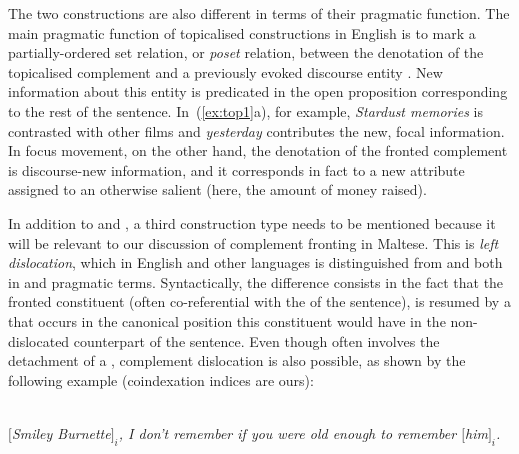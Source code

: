 \documentclass[output=paper]{LSP/langsci}
\begin{document}
\begin{exe}
  \ex{}
  \begin{xlist}
  \end{xlist}
  \label{ex:top1}
\end{exe}

The two constructions are also different in terms of their pragmatic
function. The main pragmatic function of topicalised constructions in
English is to mark a partially-ordered set relation, or {\em poset}
relation, between the denotation of the topicalised complement and a
previously evoked discourse entity \citep{Prince1981a}. New information
about this entity is predicated in the open proposition corresponding
to the rest of the sentence. In~(\ref{ex:top1}a), for example, {\em
  Stardust memories} is contrasted with other films and {\em
  yesterday} contributes the new, focal information. In focus
movement, on the other hand, the denotation of the fronted complement
is discourse-new information, and it corresponds in fact to a new
attribute assigned to an otherwise salient  (here, the
amount of money raised).

In addition to  and , a third construction
type needs to be mentioned because it will be relevant to our
discussion of complement fronting in Maltese. This is {\em left
  dislocation}, which in English and other languages is distinguished
from  and  both in  and pragmatic
terms. Syntactically, the difference consists in the fact that the
fronted constituent (often co-referential with the  of the
sentence), is resumed by a  that occurs in the canonical
position this constituent would have in the non-dislocated counterpart
of the sentence. Even though  often involves the
detachment of a , complement dislocation is also possible, as
shown by the following example (coindexation indices are ours):

\begin{exe}  
  \ex{}
  {\citealt[27]{GregoryMichaelis2001}}\\
           {\em $[$Smiley Burnette$]_i$, I don't remember if you were old enough to remember $[$him$]_i$.}
  \label{ex:LD11}
\end{exe}
\end{document}
